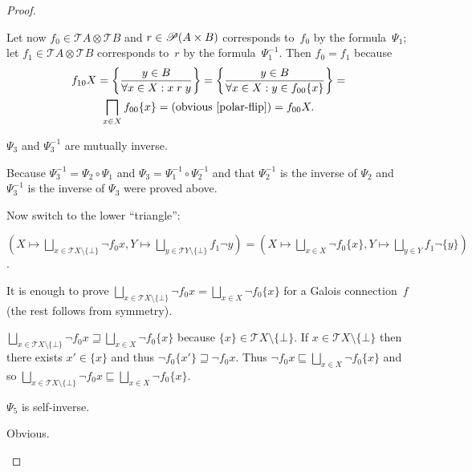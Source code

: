 \begin{proof}
\begin{claimproof}
Let now $f_{0}\in\mathscr{T}A\otimes\mathscr{T}B$ and $r\in\mathscr{P}(A\times B)$
corresponds to~$f_{0}$ by the formula~$\Psi_1$; let $f_{1}\in\mathscr{T}A\otimes\mathscr{T}B$
corresponds to~$r$ by the formula~$\Psi_1^{-1}$. Then $f_0=f_1$ because
\begin{multline*}
f_{10} X = \left\{ \frac{y\in B}{\forall x\in X:x\mathrel{r}y}\right\} = \left\{ \frac{y\in B}{\forall x\in X:y\in f_{00}\{x\}}\right\} = \\
\bigsqcap_{x\in X}f_{00}\{x\} = \text{(obvious~\ref{polar-flip})} = f_{00}X.
\end{multline*}
\end{claimproof}

\begin{claim}
$\Psi_3$ and $\Psi_3^{-1}$ are mutually inverse.
\end{claim}
\begin{claimproof}
Because $\Psi_3^{-1} = \Psi_2\circ\Psi_1$ and $\Psi_3 = \Psi_1^{-1}\circ\Psi_2^{-1}$
and that $\Psi_2^{-1}$ is the inverse of $\Psi_2$ and $\Psi_3^{-1}$ is the inverse of $\Psi_3$ were proved above.
\end{claimproof}

Now switch to the lower ``triangle'':

\begin{flushleft}
\begin{claim}
$\left(X\mapsto\bigsqcup_{x\in\mathscr{T}X\setminus\{\bot\}}\lnot f_0 x,Y\mapsto\bigsqcup_{y\in\mathscr{T}Y\setminus\{\bot\}}f_1\lnot y\right)=\left(X\mapsto\bigsqcup_{x\in X}\lnot f_0\{x\},Y\mapsto\bigsqcup_{y\in Y}f_1\lnot\{y\}\right)$.
\end{claim}
\end{flushleft}
\begin{claimproof}
It is enough to prove $\bigsqcup_{x\in\mathscr{T}X\setminus\{\bot\}}\lnot f_0 x = \bigsqcup_{x\in X}\lnot f_0\{x\}$ for a Galois connection~$f$
(the rest follows from symmetry).

$\bigsqcup_{x\in\mathscr{T}X\setminus\{\bot\}}\lnot f_0 x \sqsupseteq \bigsqcup_{x\in X}\lnot f_0\{x\}$ because $\{x\}\in\mathscr{T}X\setminus\{\bot\}$.
If $x\in\mathscr{T}X\setminus\{\bot\}$ then there exists $x'\in\{x\}$ and thus $\lnot f_0\{x'\}\sqsupseteq \lnot f_0 x$. Thus
$\lnot f_0 x \sqsubseteq \bigsqcup_{x\in X} \lnot f_0 \{x\}$ and so
$\bigsqcup_{x\in\mathscr{T}X\setminus\{\bot\}}\lnot f_0 x \sqsubseteq \bigsqcup_{x\in X}\lnot f_0\{x\}$.
\end{claimproof}

\begin{claim}
$\Psi_5$ is self-inverse.
\end{claim}
\begin{claimproof}
Obvious.
\end{claimproof}


\end{proof}
